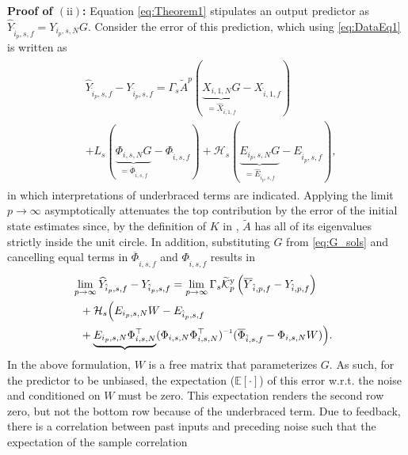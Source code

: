 \noindent\textbf{Proof of $(\mathrm{ii})$:} Equation \eqref{eq:Theorem1} stipulates an output predictor as $\widehat{Y}_{\hat{i}_p,s,f}=Y_{i_p,s,N}G$. Consider the error of this prediction, which using \eqref{eq:DataEq1} is written as
\begin{align}\label{eq:Yf_error1}
    \begin{split}
        &\!\!\!\widehat{Y}_{\hat{i}_p,s,f}-Y_{\hat{i}_p,s,f} = \Gamma_s \tilde{A}^p (\underbrace{X_{i,1,N}G}_{=\widehat{X}_{\hat{i},1,f}}-X_{\hat{i},1,f}) \\
        &+L_s(\underbrace{\Phi_{i,s,N}G}_{=\overline{\Phi}_{\hat{i},s,f}}-\Phi_{\hat{i},s,f}) +\mathcal{H}_s (\underbrace{E_{i_p,s,N}G}_{=\widehat{E}_{\hat{i}_p,s,f}}-E_{\hat{i}_p,s,f}),
    \end{split}
\end{align}
in which interpretations of underbraced terms are indicated. Applying the limit $p\rightarrow\infty$ asymptotically attenuates the top contribution by the error of the initial state estimates since, by the definition of $K$ in , $\tilde{A}$ has all of its eigenvalues strictly inside the unit circle. In addition, substituting $G$ from \eqref{eq:G_sols} and cancelling equal terms in $\overline{\Phi}_{\hat{i},s,f}$ and $\Phi_{\hat{i},s,f}$ results in
\begin{alignat}{2}
        &\!\!\!\!\lim_{p\rightarrow\infty} \widehat{Y}_{\hat{i}_p,s,f}-Y_{\hat{i}_p,s,f} = \lim_{p\rightarrow\infty}\Gamma_s\tKp{y}\left(\overline{Y}_{\hat{i},p,f}-Y_{\hat{i},p,f}\right)\notag\\
        &+\mathcal{H}_s\Big(E_{i_p,s,N} W-E_{\hat{i}_p,s,f}\label{eq:Yf_error2}\\
        &+\underbrace{E_{i_p,s,N}\Phi_{i,s,N}^\top}(\Phi_{i,s,N}\Phi_{i,s,N}^\top)\inv(\overline{\Phi}_{\hat{i},s,f}-\Phi_{i,s,N}W)\Big)\notag.
\end{alignat}%
In the above formulation, $W$ is a free matrix that parameterizes $G$. As such, for the predictor to be unbiased, the expectation ($\mathbb{E}[\cdot]$) of this error w.r.t. the noise and conditioned on $W$ must be zero.  This expectation renders the second row zero, but not the bottom row because of the underbraced term. Due to feedback, there is a correlation between past inputs and preceding noise such that the expectation of the sample correlation

